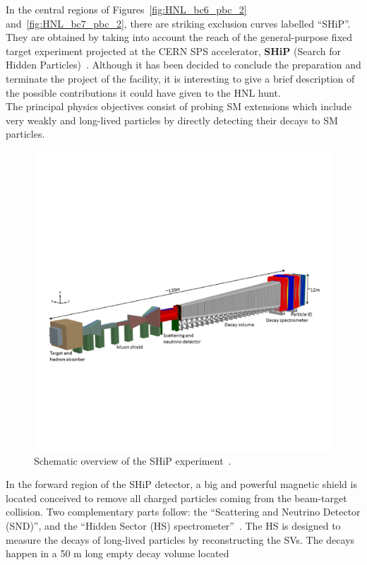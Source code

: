 In the central regions of Figures~\ref{fig:HNL_bc6_pbc_2}
and~\ref{fig:HNL_bc7_pbc_2}, there are striking exclusion curves
labelled ``SHiP''. They are obtained by taking into account the reach of
the general-purpose fixed target experiment projected at the CERN SPS
accelerator, \textbf{SHiP} (Search for Hidden Particles)~\cite{bonivento2013proposal,
  shipcollaboration2015facility}. Although it has been decided to
conclude the preparation and terminate the project of the facility,
it is interesting to give a brief description of the possible
contributions it could have given to the HNL hunt.\\
The principal physics objectives consist of probing SM extensions
which include very weakly and long-lived particles by directly
detecting their decays to SM particles.
\begin{figure}[h!]
\centering
    \includegraphics[clip,trim=0.3cm 5cm 1.cm 7cm, width=.85\textwidth]{Figures/c7/ship.pdf}
\caption{Schematic overview of the SHiP experiment~\cite{CERN-SHiP-NOTE-2018-001}.
}
\label{fig:ship1}
\end{figure}
In the forward region of the SHiP detector, a big and powerful 
magnetic shield is located conceived to remove all charged particles
coming from the beam-target collision. Two complementary
parts follow: the ``Scattering and Neutrino
Detector (SND)'', and the ``Hidden Sector (HS)
spectrometer''~\cite{CERN-SHiP-NOTE-2018-001}. The HS is designed to
measure the decays of long-lived particles by reconstructing the
SVs. The decays happen in a 50 m long empty decay volume located
